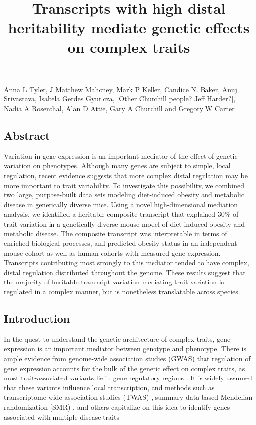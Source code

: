 \documentclass[
]{article}
\title{Transcripts with high distal heritability mediate genetic effects
on complex traits}
\author{}
\date{\vspace{-2.5em}}
\begin{document}
\maketitle

Anna L Tyler, J Matthew Mahoney, Mark P Keller, Candice N. Baker, Anuj
Srivastava, Isabela Gerdes Gyuricza, {[}Other Churchill people? Jeff
Harder?{]}, Nadia A Rosenthal, Alan D Attie, Gary A Churchill and
Gregory W Carter

\subsection{Abstract}\label{abstract}

Variation in gene expression is an important mediator of the effect of
genetic variation on phenotypes. Although many genes are subject to
simple, local regulation, recent evidence suggests that more complex
distal regulation may be more important to trait variability. To
investigate this possibility, we combined two large, purpose-built data
sets modeling diet-induced obesity and metabolic disease in genetically
diverse mice. Using a novel high-dimensional mediation analysis, we
identified a heritable composite transcript that explained 30\% of trait
variation in a genetically diverse mouse model of diet-induced obesity
and metabolic disease. The composite transcript was interpretable in
terms of enriched biological processes, and predicted obesity status in
an independent mouse cohort as well as human cohorts with measured gene
expression. Transcripts contributing most strongly to this mediator
tended to have complex, distal regulation distributed throughout the
genome. These results suggest that the majority of heritable transcript
variation mediating trait variation is regulated in a complex manner,
but is nonetheless translatable across species.

\subsection{Introduction}\label{introduction}

In the quest to understand the genetic architecture of complex traits,
gene expression is an important mediator between genotype and phenotype.
There is ample evidence from genome-wide association studies (GWAS) that
regulation of gene expression accounts for the bulk of the genetic
effect on complex traits, as most trait-associated variants lie in gene
regulatory regions \cite{pmid22955828, 
pmid25363779, pmid21617055, pmid19474294, pmid24702953, 
pmid24316577, pmid27126046}. It is widely assumed that these variants
influence local transcription, and methods such as transcriptome-wide
association studies (TWAS)
\cite{pmid33020666, pmid26258848, pmid27019110, pmid26854917}, summary
data-based Mendelian randomization (SMR) \cite{pmid27019110}, and others
capitalize on this idea to identify genes associated with multiple
disease traits \cite{pmid29567659, pmid35533209, pmid27309819, 
pmid30950127}
\end{document}
